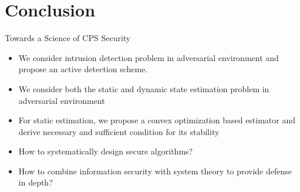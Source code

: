 \documentclass[10pt]{beamer}
\begin{document}
\section{Conclusion}

%


\begin{frame}{Towards a Science of CPS Security}
  \begin{itemize}
  \item We consider intrusion detection problem in adversarial environment and propose an active detection scheme.
    \item We consider both the static and dynamic state estimation problem in adversarial environment 
    \item For static estimation, we propose a convex optimization based estimator and derive necessary and sufficient condition for its stability
  \item How to systematically design secure algorithms?
  \item How to combine information security with system theory to provide defense in depth?
  \end{itemize}
\end{frame}
\end{document}
